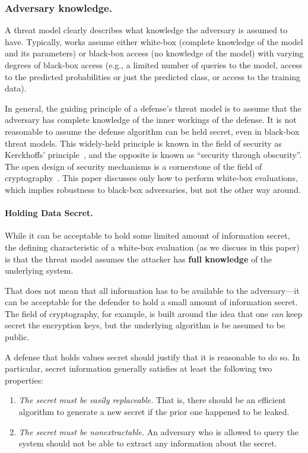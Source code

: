 \documentclass{article} %
\begin{document}
\subsubsection{Adversary knowledge.}
A threat model clearly describes what knowledge the adversary
is assumed to have.
%
Typically, works assume either white-box  (complete knowledge
of the model and its parameters) or black-box access (no knowledge of the model)
with varying degrees of black-box access
(e.g., a limited number of queries to the model, access to the
predicted probabilities or just the predicted class,
or access to the training data).

In general, the guiding principle of a defense's threat model
is to assume that the adversary has complete 
knowledge of the inner workings of the
defense.
%
It is not reasonable to assume the defense
algorithm can be held secret, even in black-box threat models.
%
This widely-held principle is known in the field of security as Kerckhoffs'
principle~\citep{kerckhoffs1883cryptographic}, and the opposite is known as
``security through obscurity''.
%
The open design of security mechanisms is
a cornerstone of the field of cryptography~\citep{saltzer1975protection}.
%
This paper discusses only how to perform white-box evaluations, which implies
robustness to black-box adversaries,
but not the other way around. 

\paragraph{Holding Data Secret.}
%
While it can be acceptable to hold some limited amount of information
secret, the defining characteristic of a white-box evaluation (as
we discuss in this paper) is that the threat model assumes
the attacker has \textbf{full knowledge} of the underlying system.

That does not mean that all information has to be available to the
adversary---it can be acceptable for the defender to hold a small
amount of information secret.
%
The field of cryptography, for example, is built around the idea that
one \emph{can} keep secret
the encryption keys, but the underlying algorithm is be assumed to be public.

A defense that holds values secret should justify that it is reasonable to do so.
%
In particular, secret information generally
satisfies at least the following two properties:
\begin{enumerate}
\item \emph{The secret must be easily replaceable.} 
  That is, there should be an efficient algorithm to generate a new secret
  if the prior one happened to be leaked.
\item \emph{The secret must be nonextractable.} An adversary who is
  allowed to query the system should not be able to extract any information
  about the secret.
\end{enumerate}
\end{document}
